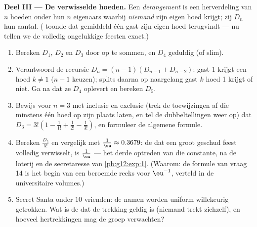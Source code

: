\begin{problem}
\medskip
\noindent\textbf{Deel III --- De verwisselde hoeden.}
Een \emph{derangement} is een herverdeling van $n$ hoeden onder hun $n$
eigenaars waarbij \emph{niemand} zijn eigen hoed krijgt; zij $D_n$ hun
aantal. ( toonde dat gemiddeld één gast zijn eigen hoed
terugvindt --- nu tellen we de volledig ongelukkige feesten exact.)
\begin{enumerate}[resume]
  \item Bereken $D_1$, $D_2$ en $D_3$ door op te sommen, en $D_4$ geduldig
        (of slim).
  \item Verantwoord de recursie $D_n = (n - 1)\left(D_{n-1} + D_{n-2}\right)$:
        gast 1 krijgt een hoed $k \neq 1$ ($n - 1$ keuzen); splits daarna op
        naargelang gast $k$ hoed 1 krijgt of niet. Ga na dat ze $D_4$ oplevert
        en bereken $D_5$.
  \item Bewijs voor $n = 3$ met inclusie en exclusie (trek de toewijzingen af
        die minstens één hoed op zijn plaats laten, en tel de dubbeltellingen
        weer op) dat
        $D_3 = 3!\left(1 - \frac{1}{1!} + \frac{1}{2!} - \frac{1}{3!}\right)$,
        en formuleer de algemene formule.
  \item Bereken $\frac{D_5}{5!}$ en vergelijk met
        $\frac1\eu \approx 0.3679$: de  dat een groot geschud feest
        volledig verwisselt, is $\frac1\eu$ --- het derde optreden van die
        constante, na de loterij en de secretaresse van \cref{pb:g12:exp:1}.
        (Waarom: de formule van vraag 14 is het begin van een beroemde reeks
        voor $\eu^{-1}$, verteld in de universitaire volumes.)
  \item Secret Santa onder $10$ vrienden: de namen worden uniform willekeurig
        getrokken. Wat is de  dat de trekking geldig is (niemand trekt
        zichzelf), en hoeveel hertrekkingen mag de groep verwachten?
\end{enumerate}


\end{problem}
